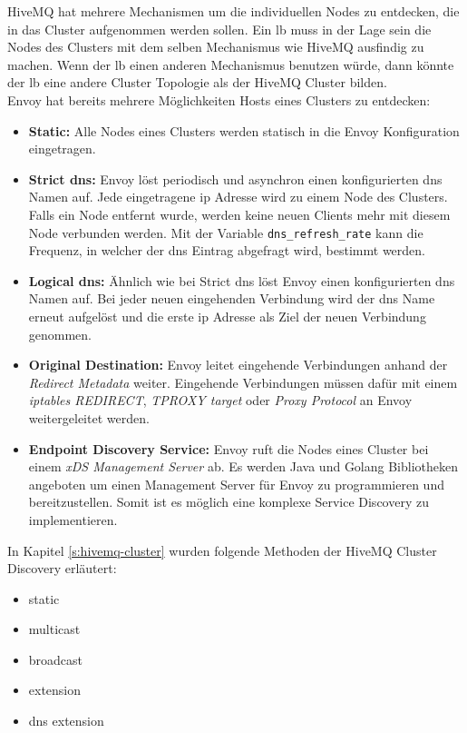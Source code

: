 HiveMQ hat mehrere Mechanismen um die individuellen Nodes zu entdecken, die in das Cluster aufgenommen werden sollen. Ein \ac{lb} muss in der Lage sein die Nodes des Clusters mit dem selben Mechanismus wie HiveMQ ausfindig zu machen. Wenn der \ac{lb} einen anderen Mechanismus benutzen würde, dann könnte der \ac{lb} eine andere Cluster Topologie als der HiveMQ Cluster bilden.\\
Envoy hat bereits mehrere Möglichkeiten Hosts eines Clusters zu entdecken:
\begin{itemize}
  \item \textbf{Static:} Alle Nodes eines Clusters werden statisch in die Envoy Konfiguration eingetragen.
  \item \textbf{Strict \ac{dns}:} Envoy löst periodisch und asynchron einen konfigurierten \ac{dns} Namen auf. Jede eingetragene \ac{ip} Adresse wird zu einem Node des Clusters. Falls ein Node entfernt wurde, werden keine neuen Clients mehr mit diesem Node verbunden werden. Mit der Variable \verb|dns_refresh_rate| kann die Frequenz, in welcher der \ac{dns} Eintrag abgefragt wird, bestimmt werden.
  \item \textbf{Logical \ac{dns}:} Ähnlich wie bei Strict \ac{dns} löst Envoy einen konfigurierten \ac{dns} Namen auf. Bei jeder neuen eingehenden Verbindung wird der \ac{dns} Name erneut aufgelöst und die erste \ac{ip} Adresse als Ziel der neuen Verbindung genommen.
  \item \textbf{Original Destination:} Envoy leitet eingehende Verbindungen anhand der \textit{Redirect Metadata} weiter. Eingehende Verbindungen müssen dafür mit einem \textit{iptables REDIRECT}, \textit{TPROXY target} oder \textit{Proxy Protocol} an Envoy weitergeleitet werden.
  \item \textbf{Endpoint Discovery Service:} Envoy ruft die Nodes eines Cluster bei einem \textit{xDS Management Server} ab. Es werden Java und Golang Bibliotheken angeboten um einen Management Server für Envoy zu programmieren und bereitzustellen. Somit ist es möglich eine komplexe Service Discovery zu implementieren.
\end{itemize}
\cite{ServiceDiscoveryEnvoy}
In Kapitel \ref{s:hivemq-cluster} wurden folgende Methoden der HiveMQ Cluster Discovery erläutert:
\begin{itemize}
  \item static
  \item multicast
  \item broadcast
  \item extension
  \item dns extension
\end{itemize}
